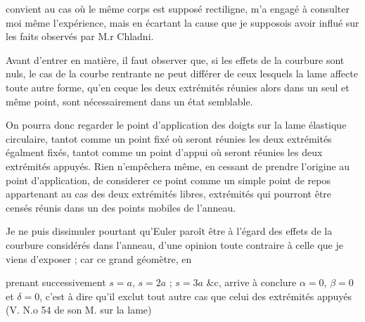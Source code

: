 \documentclass[11pt,a4paper]{article}
\begin{document}


convient au cas où le même corps est supposé rectiligne,
m'a engagé à consulter moi même l'expérience, mais en
écartant la cause que je supposois avoir influé sur les
faits observés par M.r Chladni.

Avant d'entrer en matière, il faut observer que, si les
effets de la courbure sont nuls, le cas de la courbe rentrante
ne peut différer de ceux  lesquels la lame affecte
toute autre forme, qu'en ceque les deux extrémités réunies
alors dans un seul et même point, sont nécessairement
dans un état semblable.

On pourra donc regarder le point d'application des
doigts sur la lame élastique circulaire, tantot comme
un point fixé où seront réunies les deux extrémités
égalment fixés, tantot comme un point d'appui où seront
réunies les deux extrémités appuyés. Rien n'empêchera
même, en cessant de prendre l'origine au point d'application,
de considerer ce point comme un simple point de
repos appartenant au cas des deux extrémités libres,
extrémités qui pourront être censés réunis dans un
des points mobiles de l'anneau.

Je ne puis dissimuler pourtant qu'Euler paroît être
à l'égard des effets de la courbure considérés dans
l'anneau, d'une opinion toute contraire à celle que
je viens d'exposer ; car ce grand géomètre, en



prenant successivement $s=a$, $s=2a$ ; $s=3a$ \&c, arrive à conclure
$\alpha=0$, $\beta=0$ et $\delta=0$, c'est à dire qu'il exclut tout autre cas
que celui des extrémités appuyés (V. N.o 54 de son M. sur la lame)
\end{document}
